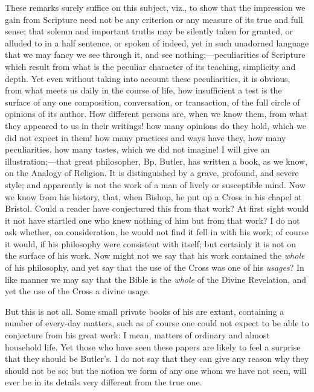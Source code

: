 These remarks surely suffice on this subject, viz., to show that
the impression we gain from Scripture need not be any criterion or any
measure of its true and full sense; that solemn and important truths
may be silently taken for granted, or alluded to in a half sentence,
or spoken of indeed, yet in such unadorned language that we may fancy
we see through it, and see nothing;—peculiarities of Scripture which
result from what is the peculiar character of its teaching, simplicity
and depth. Yet even without taking into account these peculiarities,
it is obvious, from what meets us daily in the course of life, how
insufficient a test is the surface of any one composition,
conversation, or transaction, of the full circle of opinions of its
author. How different persons are, when we know them, from what they
appeared to us in their writings! how many opinions do they hold,
which we did not expect in them! how many practices and ways have
they, how many peculiarities, how many tastes, which we did not
imagine! I will give an illustration;—that great philosopher, Bp.
Butler, has written a book, as we know, on the Analogy of Religion. It
is distinguished by a grave, profound, and severe style; and
apparently is not the work of a man of lively or susceptible mind. Now
we know from his history, that, when Bishop, he put up a Cross in his
chapel at Bristol. Could a reader have conjectured this from that
work? At first sight would it not have startled one who knew nothing
of him but from that work? I do not ask whether, on consideration, he
would not find it fell in with his work; of course it would, if his
philosophy were consistent with itself; but certainly it is not on the
surface of his work. Now might not we say that his work contained the \emph{whole}
of his philosophy, and yet say that the use of the Cross was one of
his \emph{usages}? In like manner we may say that the Bible is the \emph{whole}
of the Divine Revelation, and yet the use of the Cross a divine usage.

But this is not all. Some small private books of his are extant,
containing a number of every-day matters, such as of course one could
not expect to be able to conjecture from his great work: I mean,
matters of ordinary and almost household life. Yet those who have seen
these papers are likely to feel a surprise that they should be Butler's.
I do not say that they can give any reason why they should not be so;
but the notion we form of any one whom we have not seen, will ever be
in its details very different from the true one.

